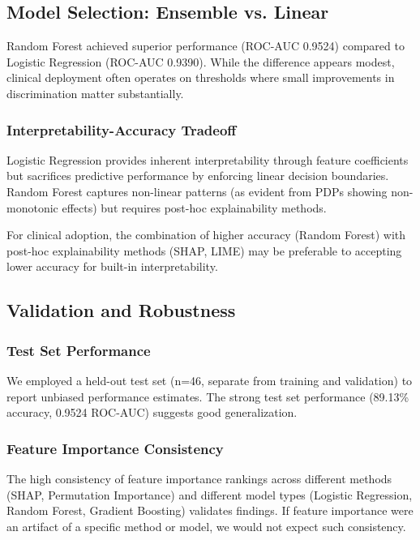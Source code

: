 \documentclass[journal]{IEEEtran}
\begin{document}
\subsection{Model Selection: Ensemble vs. Linear}

Random Forest achieved superior performance (ROC-AUC 0.9524) compared to Logistic Regression (ROC-AUC 0.9390). While the difference appears modest, clinical deployment often operates on thresholds where small improvements in discrimination matter substantially.

\subsubsection{Interpretability-Accuracy Tradeoff}

Logistic Regression provides inherent interpretability through feature coefficients but sacrifices predictive performance by enforcing linear decision boundaries. Random Forest captures non-linear patterns (as evident from PDPs showing non-monotonic effects) but requires post-hoc explainability methods.

For clinical adoption, the combination of higher accuracy (Random Forest) with post-hoc explainability methods (SHAP, LIME) may be preferable to accepting lower accuracy for built-in interpretability.

\subsection{Validation and Robustness}

\subsubsection{Test Set Performance}

We employed a held-out test set (n=46, separate from training and validation) to report unbiased performance estimates. The strong test set performance (89.13\% accuracy, 0.9524 ROC-AUC) suggests good generalization.

\subsubsection{Feature Importance Consistency}

The high consistency of feature importance rankings across different methods (SHAP, Permutation Importance) and different model types (Logistic Regression, Random Forest, Gradient Boosting) validates findings. If feature importance were an artifact of a specific method or model, we would not expect such consistency.
\end{document}
